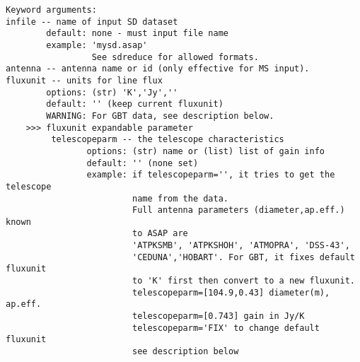 \begin{verbatim}
Keyword arguments:
infile -- name of input SD dataset
        default: none - must input file name
        example: 'mysd.asap'
                 See sdreduce for allowed formats.
antenna -- antenna name or id (only effective for MS input). 
fluxunit -- units for line flux
        options: (str) 'K','Jy',''
        default: '' (keep current fluxunit)
        WARNING: For GBT data, see description below.
    >>> fluxunit expandable parameter
         telescopeparm -- the telescope characteristics
                options: (str) name or (list) list of gain info
                default: '' (none set)
                example: if telescopeparm='', it tries to get the telescope
                         name from the data.
                         Full antenna parameters (diameter,ap.eff.) known
                         to ASAP are
                         'ATPKSMB', 'ATPKSHOH', 'ATMOPRA', 'DSS-43',
                         'CEDUNA','HOBART'. For GBT, it fixes default fluxunit
                         to 'K' first then convert to a new fluxunit.
                         telescopeparm=[104.9,0.43] diameter(m), ap.eff.
                         telescopeparm=[0.743] gain in Jy/K
                         telescopeparm='FIX' to change default fluxunit
                         see description below


\end{verbatim}
